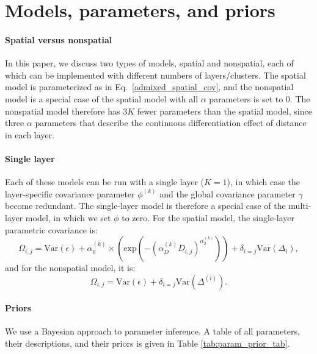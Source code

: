 \documentclass[10pt,letterpaper]{article}
\begin{document}
\section*{Models, parameters, and priors}\label{model_app}
\paragraph{Spatial versus nonspatial}
In this paper, we discuss two types of models, spatial and nonspatial, 
each of which can be implemented with different numbers of layers/clusters.
The spatial model is parameterized as in Eq.\ \eqref{admixed_spatial_cov},
and the nonspatial model
is a special case of the spatial model with all $\alpha$ parameters is set to 0.
The nonspatial model therefore has $3K$ fewer parameters than the spatial model,
since three $\alpha$ parameters that describe the continuous differentiation effect of distance in each layer.

\paragraph{Single layer}
Each of these models can be run with a single layer ($K=1$), 
in which case the layer-specific covariance parameter $\phi^{(k)}$ 
and the global covariance parameter $\gamma$ become redundant.
The single-layer model is therefore a special case of the multi-layer model, 
in which we set $\phi$ to zero.
For the spatial model, the single-layer parametric covariance is:
\begin{equation}
\Omega_{i,j} = \text{Var}(\epsilon) + 
\alpha^{(k)}_0 \times \left(\text{exp} \left(  -(\alpha^{(k)}_D D_{i,j})^{\alpha^{(k)}_2}\right) \right)	 +
\delta_{i=j} \text{Var}(\Delta_i), 
\label{admixed_continuous_cov}
\end{equation}
and for the nonspatial model, it is:
\begin{equation}
\Omega_{i,j} = \text{Var}(\epsilon) + \delta_{i=j} \text{Var}(\Delta^{(i)}) .
\label{admixed_discrete_covariance}
\end{equation}

\paragraph{Priors}
We use a Bayesian approach to parameter inference.
A table of all parameters, their descriptions, and their priors is given in Table \ref{tab:param_prior_tab}.
\end{document}
